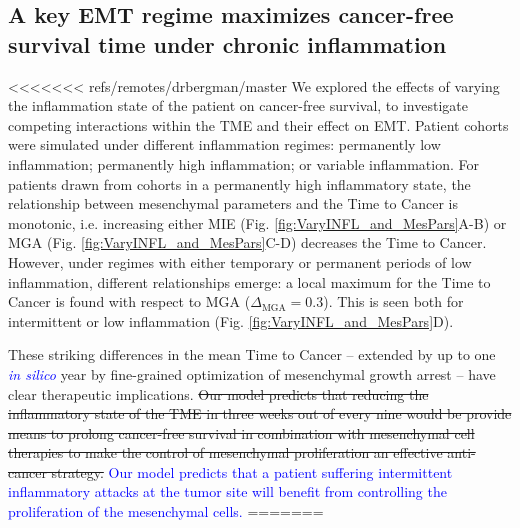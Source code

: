 \documentclass[11pt]{article}
\newcommand{\tcb} { \textcolor{blue} }
\begin{document}
\subsection{A key EMT regime maximizes cancer-free survival time under chronic inflammation}\label{KeyEMT}

<<<<<<< refs/remotes/drbergman/master
We explored the effects of varying the inflammation state of the patient on cancer-free survival, to investigate competing interactions within the TME and their effect on EMT. Patient cohorts were simulated under different inflammation regimes: permanently low inflammation; permanently high inflammation; or variable inflammation. For patients drawn from cohorts in a permanently high inflammatory state, the relationship between mesenchymal parameters and the Time to Cancer is monotonic, i.e. increasing either MIE (Fig. \ref{fig:VaryINFL_and_MesPars}A-B) or MGA (Fig. \ref{fig:VaryINFL_and_MesPars}C-D) decreases the Time to Cancer.
However, under regimes with either temporary or permanent periods of low inflammation, different relationships emerge: a local maximum for the Time to Cancer is found with respect to MGA ($\Delta_\text{MGA}= 0.3$). This is seen both for intermittent or low inflammation (Fig. \ref{fig:VaryINFL_and_MesPars}D). 
\par
These striking differences in the mean Time to Cancer -- extended by up to one \tcb{{\it in silico}} year by fine-grained optimization of mesenchymal growth arrest -- have clear therapeutic implications. 
\sout{
Our model predicts that reducing the inflammatory state of the TME in three weeks out of every nine would be provide means to prolong cancer-free survival in combination with mesenchymal cell therapies to make the control of mesenchymal proliferation an effective anti-cancer strategy.
}
\tcb{
Our model predicts that a patient suffering intermittent inflammatory attacks at the tumor site will benefit from controlling the proliferation of the mesenchymal cells.
}
=======
\end{document}
